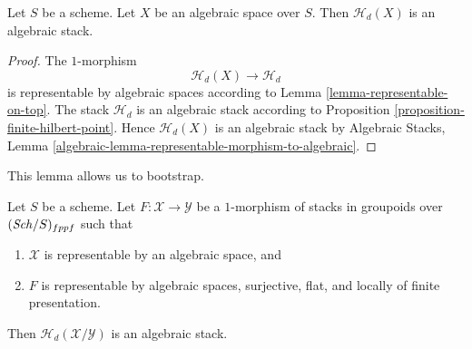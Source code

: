 \begin{lemma}
\label{lemma-hilbert-stack-of-space}
Let $S$ be a scheme.
Let $X$ be an algebraic space over $S$.
Then $\mathcal{H}_d(X)$ is an algebraic stack.
\end{lemma}

\begin{proof}
The $1$-morphism
$$
\mathcal{H}_d(X) \longrightarrow \mathcal{H}_d
$$
is representable by algebraic spaces according to
Lemma \ref{lemma-representable-on-top}.
The stack $\mathcal{H}_d$ is an algebraic stack according to
Proposition \ref{proposition-finite-hilbert-point}.
Hence $\mathcal{H}_d(X)$ is an algebraic stack by
Algebraic Stacks,
Lemma \ref{algebraic-lemma-representable-morphism-to-algebraic}.
\end{proof}

\noindent
This lemma allows us to bootstrap.

\begin{lemma}
\label{lemma-hilbert-stack-relative-space}
Let $S$ be a scheme. Let $F : \mathcal{X} \to \mathcal{Y}$ be a $1$-morphism
of stacks in groupoids over $(\mathit{Sch}/S)_{fppf}$ such that
\begin{enumerate}
\item $\mathcal{X}$ is representable by an algebraic space, and
\item $F$ is representable by algebraic spaces, surjective, flat, and
locally of finite presentation.
\end{enumerate}
Then $\mathcal{H}_d(\mathcal{X}/\mathcal{Y})$ is an algebraic stack.
\end{lemma}

